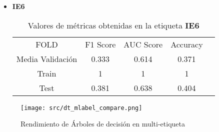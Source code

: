\begin{itemize}
\begin{table}[H]
	      \end{table}
	\item  \textbf{IE6}
	      \begin{table}[H]
		      \centering
		      \begin{tabular}{|c|c|c|c|c}
			      \cline{1-4}
			      FOLD             & F1 Score & AUC Score & Accuracy \\ \cline{1-4}
			      Media Validación & 0.333    & 0.614     & 0.371    \\ \cline{1-4}
			      Train            & 1        & 1         & 1        \\ \cline{1-4}
			      Test             & 0.381    & 0.638     & 0.404    \\ \cline{1-4}
		      \end{tabular}
		      \caption{Valores de métricas obtenidas en la etiqueta \textbf{IE6}}
	      \end{table}
\end{itemize}

\begin{figure}[H]
	\centering
	\texttt{[image: src/dt\_mlabel\_compare.png]}
	\caption{Rendimiento de Árboles de decisión en multi-etiqueta}
	\label{fig:dtml_cmp}
\end{figure}
